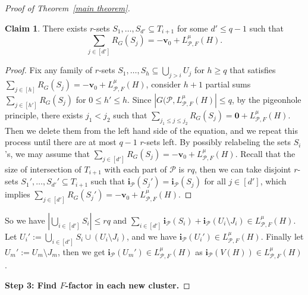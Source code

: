 \documentclass[11pt, letterpaper]{amsart}
\theoremstyle{plain}
\numberwithin{equation}{section}
\theoremstyle{definition}
\newtheorem{claim}[thm]{Claim}
\newcommand\card[1]{\left| #1 \right|}
\renewcommand{\vec}[1]{{\mathbf #1}}
\begin{document}
\begin{proof}[Proof of Theorem~\ref{main theorem}]
         \begin{claim}
             There exists $r$-sets $ S_1,\dots,S_{d'}\subseteq  T_{i+1}$ for some $ d'\le q-1$ such that $$\sum_{j\in[d']}R_G(S_j)=-\vec{v_0}+L_{\mathcal{P},F}^{\mu}(H).$$
         \end{claim}
    
	\begin{proof}
	    Fix any family of $r$-sets $ S_1,\dots,S_{h}\subseteq\bigcup_{j> i} U_{j}$ for $h\ge q$ that satisfies $\sum_{j\in[h]}R_G(S_j)=-\vec{v_0}+L_{\mathcal{P},F}^{\mu}(H)$, consider $h+1$ partial sums $\sum_{j\in[h']}R_G(S_j)$ for $0\le h'\le h$. 
        Since $|G(\mathcal{P},L_{\mathcal{P},F}^{\mu}(H)|\le q$, by the pigeonhole principle, there exists $j_1<j_2$ such that $\sum_{j_1\le j \le j_2}R_G(S_j)=\vec{0}+L_{\mathcal{P},F}^{\mu}(H)$. 
        Then we delete them from the left hand side of the equation, and we repeat this process until there are at most $q-1$ $r$-sets left. 
        By possibly relabeling the sets $ S_i$'s, we may assume that $\sum_{j\in[d']}R_G(S_j)=-\vec{v_0}+L_{\mathcal{P},F}^{\mu}(H).$ Recall that the size of intersection of $T_{i+1}$ with each part of $\mathcal{P}$ is $rq$, then we can take disjoint $r$-sets $S_1',\dots,S_{d'}'\subseteq  T_{i+1}$ such that $\vec{i}_{\mathcal{P}}(S_j')=\vec{i}_{\mathcal{P}}(S_j)$ for all $j\in[d']$, which implies $\sum_{j\in[d']}R_G(S_j')=-\vec{v_0}+L_{\mathcal{P},F}^{\mu}(H)$. 
	\end{proof}
        So we have $\card{\bigcup_{i\in[d']} S_i }\le rq$ and $\sum_{i\in[d']}\vec{i}_{\mathcal{P}}(S_i)+\vec{i}_{\mathcal{P}}(U_{i}\setminus J_i)\in L_{\mathcal{P},F}^{\mu}(H)$. 
        Let $U_{i}':=\bigcup_{i\in[d']} S_i \cup (U_{i}\setminus J_i)$, and we have $\vec{i}_{\mathcal{P}}(U_{i}')\in L_{\mathcal{P},F}^{\mu}(H)$. 
        Finally let \(U_m':=U_{m}\setminus J_m\), then we get \(\vec{i}_{\mathcal{P}}(U_m')\in L_{\mathcal{P}, F}^{\mu}(H)\) as $\vec{i}_{\mathcal{P}}(V(H))\in L_{\mathcal{P},F}^{\mu}(H)$. 

         \medskip
         \textbf{Step 3: Find $F$-factor in each new cluster.} 


\end{proof}
\end{document}
